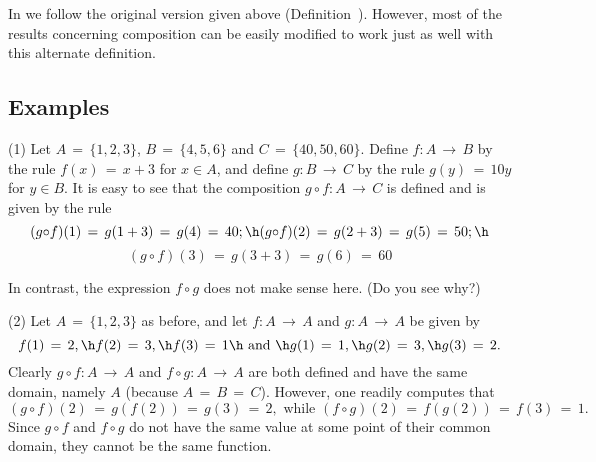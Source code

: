 \V

        In {\TheseNotes} we follow the original version given above (Definition~). However,
    most of the results concerning composition can be easily modified to work just as well with this alternate definition.

\VV

        \subsection{\small{{\bf Examples}}}
        \label{ExampA30.150}

\hspace*{\parindent}
        (1) Let $A \,=\, \{1,2,3\}$, $B \,=\, \{4,5,6\}$ and $C \,=\, \{40,50,60\}$.
    Define $f:A \,{\rightarrow}\, B$ by the rule $f(x) \,=\, x+3$ for $x{\in}A$, and define $g:B \,{\rightarrow}\, C$ by the rule $g(y) \,=\, 10y$ for $y{\in}B$.
    It is easy to see that the composition $g{\circ}f:A \,{\rightarrow}\, C$ is defined and is given by the rule
        \begin{displaymath}
        (g{\circ}f)(1) \,=\, g(1+3) \,=\, g(4) \,=\, 40; \h
        (g{\circ}f)(2) \,=\, g(2+3) \,=\, g(5) \,=\, 50; \h
        \end{displaymath}
        \begin{displaymath} 
       (g{\circ}f)(3) \,=\, g(3+3) \,=\, g(6) \,=\, 60
        \end{displaymath}

        In contrast, the expression $f{\circ}g$ does not make sense here. (Do you see why?)

\V

        (2) Let $A \,=\, \{1,2,3\}$ as before, and let $f:A \,{\rightarrow}\, A$ and $g:A \,{\rightarrow}\, A$ be given by
        \begin{displaymath}
        f(1) \,=\, 2, \h f(2) \,=\, 3, \h f(3) \,=\, 1
        \h \mbox{ and } \h
        g(1) \,=\, 1, \h g(2) \,=\, 3, \h g(3) \,=\, 2.
        \end{displaymath}
    Clearly $g{\circ}f:A \,{\rightarrow}\, A$ and $f{\circ}g:A \,{\rightarrow}\, A$ are both defined and have the same domain, namely $A$ (because $A \,=\, B \,=\, C$).
    However, one readily computes that
        \begin{displaymath}
        (g{\circ}f)(2) \,=\, g(f(2)) \,=\, g(3) \,=\, 2,
        \mbox{ while }
        (f{\circ}g)(2) \,=\, f(g(2)) \,=\, f(3) \,=\, 1.
        \end{displaymath}
    Since $g{\circ}f$ and $f{\circ}g$ do not have the same value at some point of their common domain, they cannot be the same function.

